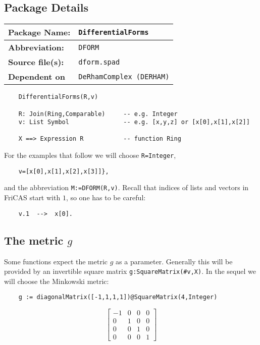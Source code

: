 \documentclass[12pt,a4paper]{article}
\begin{document}
\subsection{Package Details}
%

\begin{tabular}{|l|l|}
   \hline 
   {\bf Package Name:} & {\tt DifferentialForms} \\ 
   \hline 
   {\bf Abbreviation:} & {\tt DFORM} \\ 
   \hline 
   {\bf Source file(s):} & {\tt dform.spad} \\ 
   \hline 
   {\bf Dependent on} & {\tt DeRhamComplex (DERHAM)} \\ 
   \hline 
   \end{tabular}    
%
\begin{lstlisting}
    DifferentialForms(R,v) 
    
    R: Join(Ring,Comparable)     -- e.g. Integer
    v: List Symbol               -- e.g. [x,y,z] or [x[0],x[1],x[2]]

    X ==> Expression R           -- function Ring   
\end{lstlisting}
%
For the examples that follow we will choose {\tt R=Integer}, 
\begin{verbatim}
    v=[x[0],x[1],x[2],x[3]]},
\end{verbatim}
and the abbreviation {\tt M:=DFORM(R,v)}. Recall that indices of lists
and vectors in FriCAS start with $1$, so one has to be careful:
\begin{verbatim}
    v.1  -->  x[0].
\end{verbatim}
%

\subsection{The metric $g$}
Some functions expect the metric $g$ as a parameter. Generally this
will be provided by an invertible square matrix 
{\tt g:SquareMatrix(\#v,X)}. 
In the sequel we will choose the Minkowski metric:
%
\begin{lstlisting}    
    g := diagonalMatrix([-1,1,1,1])@SquareMatrix(4,Integer)
\end{lstlisting}   

\begin{displaymath}
	 \left[
  \begin{array}{cccc}
  -1 & 0 & 0 & 0 \\
  0 & 1 & 0 & 0 \\
  0 & 0 & 1 & 0 \\
  0 & 0 & 0 & 1
  \end{array}
  \right]
\end{displaymath}
\end{document}
